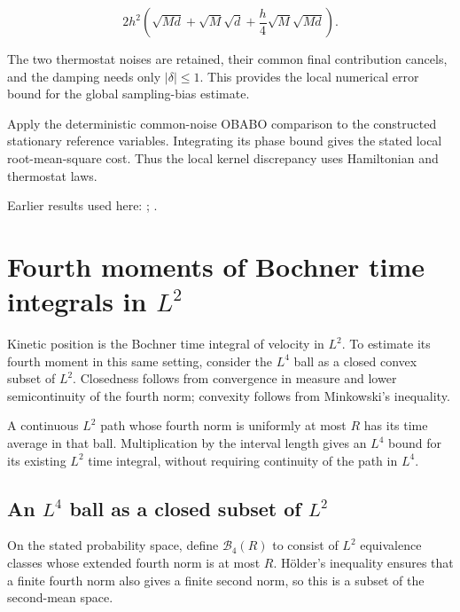\documentclass[11pt,a4paper]{report}
\begin{document}
\[2h^2\left(\sqrt{Md}+\sqrt M\sqrt d+\frac{h}{4}\sqrt M\sqrt{Md}\right).\]

The two thermostat noises are retained, their common final contribution cancels, and the damping needs only \(|\delta|\le1\). This provides the local numerical error bound for the global sampling-bias estimate.



Apply the deterministic common-noise OBABO comparison to the constructed stationary reference variables. Integrating its phase bound gives the stated local root-mean-square cost. Thus the local kernel discrepancy uses Hamiltonian and thermostat laws.



Earlier results used here: \cite[Section~3.13.2]{LangevinLean2026ULASC}; \cite[Section~3.13.5]{LangevinLean2026ULASC}.
\section{\texorpdfstring{Fourth moments of Bochner time integrals in \(L^{2}\)}{Fourth moments of Bochner time integrals in L²}}
\label{proof-module-KineticLangevin-LpMomentIntegral-lean}


Kinetic position is the Bochner time integral of velocity in \(L^2\). To estimate its fourth moment in this same setting, consider the \(L^4\) ball as a closed convex subset of \(L^2\). Closedness follows from convergence in measure and lower semicontinuity of the fourth norm; convexity follows from Minkowski's inequality.



A continuous \(L^2\) path whose fourth norm is uniformly at most \(R\) has its time average in that ball. Multiplication by the interval length gives an \(L^4\) bound for its existing \(L^2\) time integral, without requiring continuity of the path in \(L^4\).

\subsection{\texorpdfstring{An \(L^{4}\) ball as a closed subset of \(L^{2}\)}{An L⁴ ball as a closed subset of L²}}
\label{report-step-KineticLangevin-LpMomentIntegral-lean-1}


On the stated probability space, define \(\mathcal B_4(R)\) to consist of \(L^2\) equivalence classes whose extended fourth norm is at most \(R\). Hölder's inequality ensures that a finite fourth norm also gives a finite second norm, so this is a subset of the second-mean space.
\end{document}
